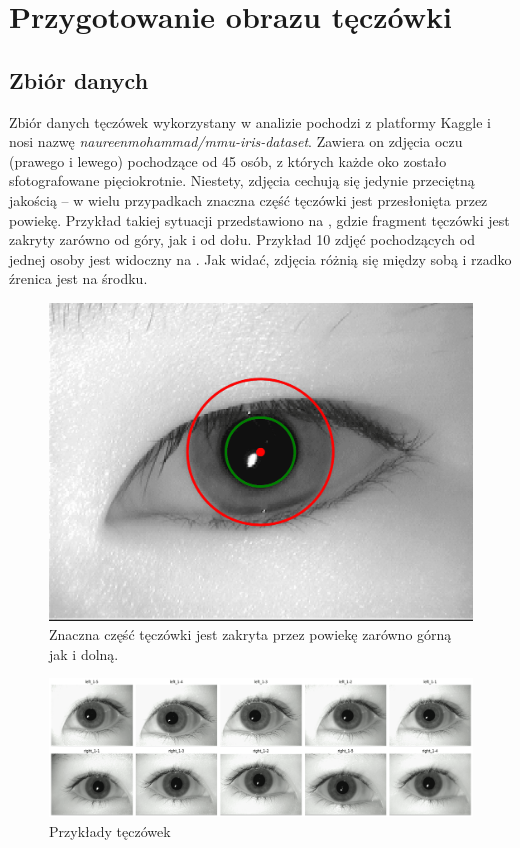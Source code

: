 \documentclass[a4paper]{article}
\begin{document}
\clearpage

\section{Przygotowanie obrazu tęczówki}

\subsection{Zbiór danych}
Zbiór danych tęczówek wykorzystany w analizie pochodzi z platformy Kaggle i nosi nazwę \emph{naureenmohammad/mmu-iris-dataset}. Zawiera on zdjęcia oczu (prawego i lewego) pochodzące od 45 osób, z których każde oko zostało sfotografowane pięciokrotnie. Niestety, zdjęcia cechują się jedynie przeciętną jakością – w wielu przypadkach znaczna część tęczówki jest przesłonięta przez powiekę. Przykład takiej sytuacji przedstawiono na , gdzie fragment tęczówki jest zakryty zarówno od góry, jak i od dołu. Przykład 10 zdjęć pochodzących od jednej osoby jest widoczny na . Jak widać, zdjęcia różnią się między sobą i rzadko źrenica jest na środku.

\begin{figure}[H]
    \centering
    \includegraphics[width=0.3\linewidth]{figures/zdj_zakryte_powieka.png}
    \caption{Znaczna część tęczówki jest zakryta przez powiekę zarówno górną jak i dolną.}
    \label{fig:powieka_zakrywa_teczowke}
\end{figure}

\begin{figure}[H]
    \centering
    \includegraphics[width=0.75\linewidth]{figures/przyklady teczowek.png}
    \caption{Przykłady tęczówek}
    \label{fig:przyklady-teczowek}
\end{figure}
\end{document}
